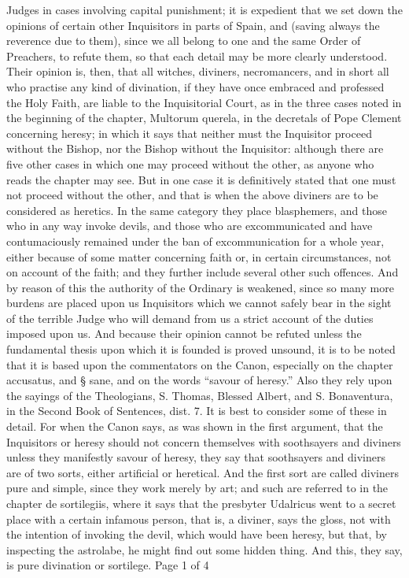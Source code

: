       Judges in cases involving capital punishment; it is expedient that we set down the opinions
       of certain other Inquisitors in parts of Spain, and (saving always the reverence due to them),
       since we all belong to one and the same Order of Preachers, to refute them, so that each
       detail may be more clearly understood.
              Their opinion is, then, that all witches, diviners, necromancers, and in short all who
       practise any kind of divination, if they have once embraced and professed the Holy Faith,
       are liable to the Inquisitorial Court, as in the three cases noted in the beginning of the
       chapter, Multorum querela, in the decretals of Pope Clement concerning heresy; in which it
       says that neither must the Inquisitor proceed without the Bishop, nor the Bishop without the
       Inquisitor: although there are five other cases in which one may proceed without the other,
       as anyone who reads the chapter may see. But in one case it is definitively stated that one
       must not proceed without the other, and that is when the above diviners are to be considered
       as heretics.
              In the same category they place blasphemers, and those who in any way invoke devils,
       and those who are excommunicated and have contumaciously remained under the ban of
       excommunication for a whole year, either because of some matter concerning faith or, in
       certain circumstances, not on account of the faith; and they further include several other
       such offences. And by reason of this the authority of the Ordinary is weakened, since so
       many more burdens are placed upon us Inquisitors which we cannot safely bear in the sight
       of the terrible Judge who will demand from us a strict account of the duties imposed upon
       us.
              And because their opinion cannot be refuted unless the fundamental thesis upon which
       it is founded is proved unsound, it is to be noted that it is based upon the commentators on
       the Canon, especially on the chapter accusatus, and § sane, and on the words “savour of
       heresy.” Also they rely upon the sayings of the Theologians, S. Thomas, Blessed Albert, and
       S. Bonaventura, in the Second Book of Sentences, dist. 7.
              It is best to consider some of these in detail. For when the Canon says, as was shown in
       the first argument, that the Inquisitors or heresy should not concern themselves with
       soothsayers and diviners unless they manifestly savour of heresy, they say that soothsayers
       and diviners are of two sorts, either artificial or heretical. And the first sort are called
       diviners pure and simple, since they work merely by art; and such are referred to in the
       chapter de sortilegiis, where it says that the presbyter Udalricus went to a secret place with a
       certain infamous person, that is, a diviner, says the gloss, not with the intention of invoking
       the devil, which would have been heresy, but that, by inspecting the astrolabe, he might find
       out some hidden thing. And this, they say, is pure divination or sortilege.
                                                                 Page 1 of 4


